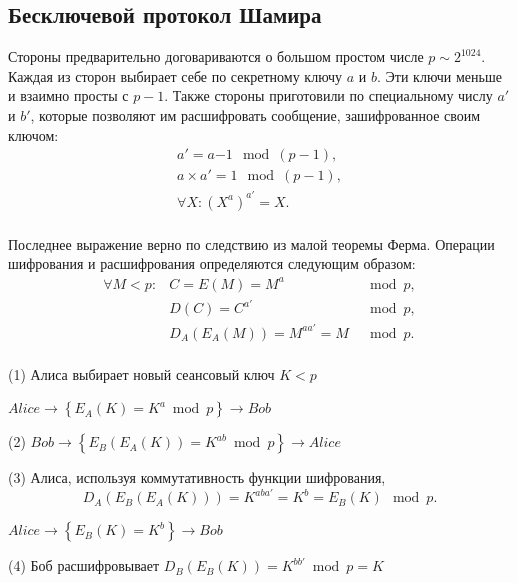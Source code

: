 \subsection{Бесключевой протокол Шамира}\label{section-protocols-shamir}

Стороны предварительно договариваются о большом простом числе $p \sim 2^{1024}$. Каждая из сторон выбирает себе по секретному ключу $a$ и $b$. Эти ключи меньше и взаимно просты с $p-1$. Также стороны приготовили по специальному числу $a'$ и $b'$, которые позволяют им расшифровать сообщение, зашифрованное своим ключом:
\[\begin{array}{l}
a' = a{-1} \mod (p-1), \\
a \times a' = 1 \mod (p-1), \\
\forall X: (X^a)^{a'} = X. \\
\end{array}\]

Последнее выражение верно по следствию из малой теоремы Ферма. Операции шифрования и расшифрования определяются следующим образом:
\[\begin{array}{lll}
\forall M < p: & C = E( M ) = M^{a}            & \mod p, \\
               & D( C ) = C^{a'}               & \mod p, \\
               & D_A( E_A( M ) ) = M^{aa'} = M & \mod p. \\
\end{array}\]

\begin{protocol}
    \item[(1)] Алиса выбирает новый сеансовый ключ $K < p$
    \item[{}] $Alice \to \left\{ E_A \left( K \right) = K^a \bmod p \right\} \to Bob$
    \item[(2)] $Bob \to \left\{ E_B \left( E_A \left( K \right) \right) = K^{ab} \bmod p \right\} \to Alice$
    \item[(3)] Алиса, используя коммутативность функции шифрования,
	\[ D_A \left( E_B \left( E_A \left( K \right) \right) \right) = K^{aba'} = K^b = E_B \left( K \right) \mod p. \]
    \item[{}] $Alice \to \left\{ E_B \left( K \right) = K^b \right\} \to Bob$
    \item[(4)] Боб расшифровывает $D_B \left( E_B \left( K \right) \right) = K^{bb'} \bmod p = K$
\end{protocol}

